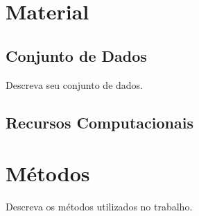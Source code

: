 \section{Material}

\subsection{Conjunto de Dados} 

Descreva seu conjunto de dados.

\subsection{Recursos Computacionais}

\section{Métodos}

Descreva os métodos utilizados no trabalho. 
